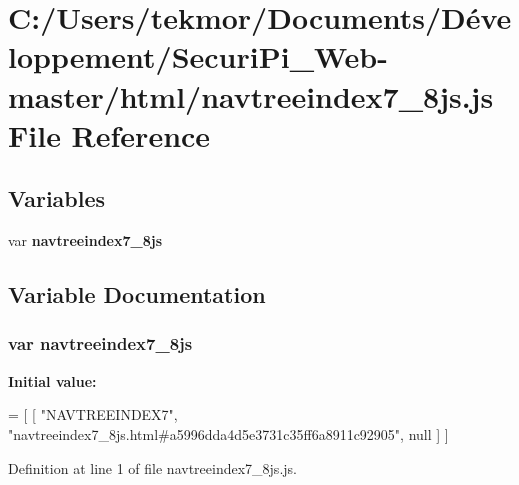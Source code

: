 \section{C\+:/\+Users/tekmor/\+Documents/\+Développement/\+Securi\+Pi\+\_\+\+Web-\/master/html/navtreeindex7\+\_\+8js.js File Reference}
\label{navtreeindex7__8js_8js}
\subsection*{Variables}
\begin{DoxyCompactItemize}
\item 
var {\bf navtreeindex7\+\_\+8js}
\end{DoxyCompactItemize}


\subsection{Variable Documentation}
\subsubsection[{navtreeindex7\+\_\+8js}]{\setlength{\rightskip}{0pt plus 5cm}var navtreeindex7\+\_\+8js}\label{navtreeindex7__8js_8js_a60c1ac9558a570d5449eee92d48f31cc}
{\bfseries Initial value\+:}
\begin{DoxyCode}
=
[
    [ \textcolor{stringliteral}{"NAVTREEINDEX7"}, \textcolor{stringliteral}{"navtreeindex7\_8js.html#a5996dda4d5e3731c35ff6a8911c92905"}, null ]
]
\end{DoxyCode}


Definition at line 1 of file navtreeindex7\+\_\+8js.\+js.


